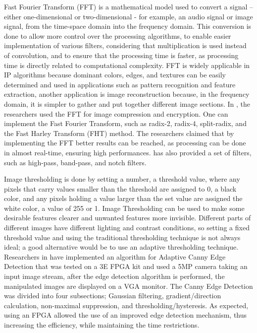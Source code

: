 \par	Fast Fourier Transform (FFT) is a mathematical model used to convert a signal – either one-dimensional or two-dimensional - for example, an audio signal or image signal, from the time-space domain into the frequency domain. This conversion is done to allow more control over the processing algorithms, to enable easier implementation of various filters, considering that multiplication is used instead of convolution, and to ensure that the processing time is faster, as processing time is directly related to computational complexity. FFT is widely applicable in IP algorithms because dominant colors, edges, and textures can be easily determined and used in applications such as pattern recognition and feature extraction, another application is image reconstruction because, in the frequency domain, it is simpler to gather and put together different image sections. In \cite{ten}, the researchers used the FFT for image compression and encryption. One can implement the Fast Fourier Transform, such as radix-2, radix-4, split-radix, and the Fast Harley Transform (FHT) method. The researchers claimed that by implementing the FFT better results can be reached, as processing can be done in almost real-time, ensuring high performances.\cite{ten} has also provided a set of filters, such as high-pass, band-pass, and notch filters. \newline
\par	Image thresholding is done by setting a number, a threshold value, where any pixels that carry values smaller than the threshold are assigned to 0, a black color, and any pixels holding a value larger than the set value are assigned the white color, a value of 255 or 1. Image Thresholding can be used to make some desirable features clearer and unwanted features more invisible. Different parts of different images have different lighting and contrast conditions, so setting a fixed threshold value and using the traditional thresholding technique is not always ideal; a good alternative would be to use an adaptive thresholding technique. Researchers in \cite{fifteen} have implemented an algorithm for Adaptive Canny Edge Detection that was tested on a 3E FPGA kit and used a 5MP camera taking an input image stream, after the edge detection algorithm is performed, the manipulated images are displayed on a VGA monitor. The Canny Edge Detection was divided into four subsections; Gaussian filtering, gradient/direction calculation, non-maximal suppression, and thresholding/hysteresis.  As expected, using an FPGA allowed the use of an improved edge detection mechanism, thus increasing the efficiency, while maintaining the time restrictions. \newline

